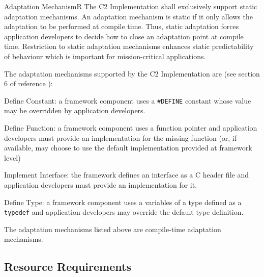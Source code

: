 \documentclass[a4paper,10pt]{article}
\newenvironment{fw_itemize}						%
{\begin{itemize}
  \setlength{\itemsep}{1mm}
  \setlength{\parskip}{0pt}
  \setlength{\parsep}{0pt}}
{\end{itemize}}
\newenvironment{fw_req_note}[7]
{\addtocounter{subsubsection}{1}
	\hspace{0.2cm}\textbf{FW-\arabic{section}.\arabic{subsection}.\arabic{subsubsection}/#2
	\hspace{0.8cm} #1}
	\vspace{-10pt}
\begin{longtable}{p{2.7cm}P{8.5cm}}
\hline
\textsc{Requirement} & #3 \\
\textsc{Note} & #4 \\
\textsc{Justification} & #5 \\
\textsc{Implementation} & #6  \\ 
\textsc{Verification} & #7  \\
\hline
}
{\end{longtable}}
\begin{document}
\begin{fw_req_note}{Adaptation Mechanism}{R}
{The C2 Implementation shall exclusively support static adaptation mechanisms.}
{An adaptation mechanism is static if it only allows the adaptation to be performed at compile time. Thus, static adaptation forces application developers to decide how to close an adaptation point at compile time.}
{Restriction to static adaptation mechanisms enhances static predictability of behaviour which is important for mission-critical applications.}
{The adaptation mechanisms supported by the C2 Implementation are (see section 6 of reference \cite{ref:C2Implementation}):

\begin{fw_itemize}
\item Define Constant: a framework component uses a \texttt{\#DEFINE} constant whose value may be overridden by application developers.
\item Define Function: a framework component uses a function pointer and application developers must provide an implementation for the missing function (or, if available, may choose to use the default implementation provided at framework level)
\item Implement Interface: the framework defines an interface as a C header file and application developers must provide an implementation for it.
\item Define Type: a framework component uses a variables of a type defined as a \texttt{typedef} and application developers may override the default type definition.
\end{fw_itemize} } 
{The adaptation mechanisms listed above are compile-time adaptation mechanisms.}
\end{fw_req_note}


\subsection{Resource Requirements}\label{req:resourceReqs}
\end{document}
